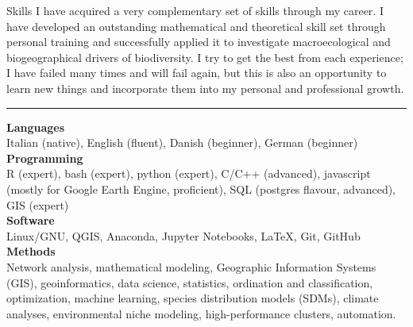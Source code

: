 \documentclass{resume} %
\newcommand{\spazio}{\begin{center} \par\noindent\rule{0.2\textwidth}{0.4pt} \end{center}}
\begin{document}
\begin{rSection}{Skills}
I have acquired a very complementary set of skills through my career.
I have developed an outstanding mathematical and theoretical skill set through personal training and successfully applied it to investigate macroecological and biogeographical drivers of biodiversity.
I try to get the best from each experience; I have failed many times and will fail again, but this is also an opportunity to learn new things and incorporate them into my personal and professional growth.

\spazio

{\bf Languages}\\
Italian (native), English (fluent), Danish (beginner), German (beginner)\\
{\bf Programming}\\
R (expert), bash (expert), python (expert), C/C++ (advanced), javascript (mostly for Google Earth Engine, proficient), SQL (postgres flavour, advanced), GIS (expert)\\
{\bf Software} \\
Linux/GNU, QGIS, Anaconda, Jupyter Notebooks, \LaTeX, Git, GitHub\\
{\bf Methods} \\
Network analysis,
mathematical modeling,
Geographic Information Systems (GIS),
geoinformatics,
data science,
statistics,
ordination and classification,
optimization,
machine learning,
species distribution models (SDMs),
climate analyses,
environmental niche modeling,
high-performance clusters, 
automation.
\end{rSection}
\end{document}
